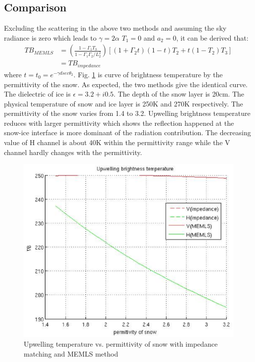 \subsection{Comparison}
Excluding the scattering in the above two methods and assuming the sky radiance is zero which leads to $\gamma=2\alpha$ $T_1=0$ and $a_2=0$, it can be derived that:
\begin{equation*}
\begin{split}
  TB_{MEMLS} &= \left(\frac{1-\Gamma_1T_3}{1-\Gamma_1\Gamma_2/L_2^2}\right)\left[(1+\Gamma_2t)(1-t)T_2+t(1-T_2)T_3\right]\\
            &= TB_{impedance}
\end{split}
\end{equation*}
where $t=t_0=e^{-\gamma dsec\theta_2}$.
Fig. \ref{fig:2layer} is curve of brightness temperature by the permittivity of the snow. As expected, the two methods give the identical curve. The dielectric of ice is $\epsilon=3.2+i0.5$. The depth of the snow layer is 20cm. The physical temperature of snow and ice layer is 250K and 270K respectively. The permittivity of the snow varies from 1.4 to 3.2. Upwelling brightness temperature reduces with larger permittivity which shows the reflection happened at the snow-ice interface is more dominant of the radiation contribution. The decreasing value of H channel is about 40K within the permittivity range while the V channel hardly changes with the permittivity.
\begin{figure}[hbp]
  \centering
   \includegraphics[scale=0.5]{2layer.eps} 
  \caption{Upwelling temperature vs. permittivity of snow with impedance matching and MEMLS method }
  \label{fig:2layer}
\end{figure}
\clearpage

